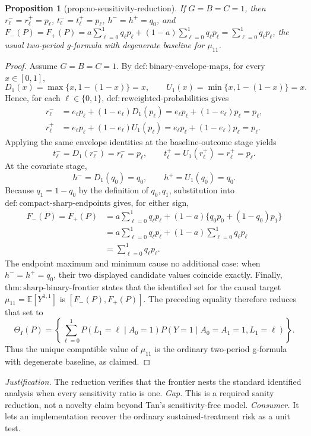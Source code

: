 \documentclass{article}
\newtheorem{proposition}{Proposition}
\begin{document}
\begin{proposition}[prop:no-sensitivity-reduction]\label{prop:no-sensitivity-reduction}
If \(G=B=C=1\), then \(r_\ell^-=r_\ell^+=p_\ell\), \(t_\ell^-=t_\ell^+=p_\ell\), \(h^-=h^+=q_0\), and \(F_-(P)=F_+(P)=a\sum_{\ell=0}^1q_\ell p_\ell+(1-a)\sum_{\ell=0}^1q_\ell p_\ell=\sum_{\ell=0}^1q_\ell p_\ell\), the usual two-period g-formula with degenerate baseline for \(\mu_{11}\).
\end{proposition}
\begin{proof}
Assume \(G=B=C=1\).  By \(\mathrm{def{:}binary\text{-}envelope\text{-}maps}\), for every \(x\in[0,1]\),
\[
D_1(x)=\max\{x,1-(1-x)\}=x,
\qquad
U_1(x)=\min\{x,1-(1-x)\}=x.
\]
Hence, for each \(\ell\in\{0,1\}\), \(\mathrm{def{:}reweighted\text{-}probabilities}\) gives
\[
\begin{aligned}
r_\ell^-
 &=e_\ell p_\ell+(1-e_\ell)D_1(p_\ell)
  =e_\ell p_\ell+(1-e_\ell)p_\ell=p_\ell,\\
r_\ell^+
 &=e_\ell p_\ell+(1-e_\ell)U_1(p_\ell)
  =e_\ell p_\ell+(1-e_\ell)p_\ell=p_\ell.
\end{aligned}
\]
Applying the same envelope identities at the baseline-outcome stage yields
\[
t_\ell^-=D_1(r_\ell^-)=r_\ell^-=p_\ell,
\qquad
t_\ell^+=U_1(r_\ell^+)=r_\ell^+=p_\ell.
\]
At the covariate stage,
\[
h^-=D_1(q_0)=q_0,
\qquad
h^+=U_1(q_0)=q_0.
\]
Because \(q_1=1-q_0\) by the definition of \(q_0,q_1\), substitution into \(\mathrm{def{:}compact\text{-}sharp\text{-}endpoints}\) gives, for either sign,
\[
\begin{aligned}
F_-(P)=F_+(P)
 &=a\sum_{\ell=0}^1q_\ell p_\ell
   +(1-a)\{q_0p_0+(1-q_0)p_1\}\\
 &=a\sum_{\ell=0}^1q_\ell p_\ell
   +(1-a)\sum_{\ell=0}^1q_\ell p_\ell\\
 &=\sum_{\ell=0}^1q_\ell p_\ell.
\end{aligned}
\]
The endpoint maximum and minimum cause no additional case: when \(h^-=h^+=q_0\), their two displayed candidate values coincide exactly.  Finally, \(\mathrm{thm{:}sharp\text{-}binary\text{-}frontier}\) states that the identified set for the causal target \(\mu_{11}=\mathbb E[Y^{1,1}]\) is \([F_-(P),F_+(P)]\).  The preceding equality therefore reduces that set to
\[
\Theta_I(P)=\left\{\sum_{\ell=0}^1
P(L_1=\ell\mid A_0=1)
P(Y=1\mid A_0=A_1=1,L_1=\ell)\right\}.
\]
Thus the unique compatible value of \(\mu_{11}\) is the ordinary two-period g-formula with degenerate baseline, as claimed.
\end{proof}
\par\smallskip\noindent \textit{Justification.} The reduction verifies that the frontier nests the standard identified analysis when every sensitivity ratio is one. \textit{Gap.} This is a required sanity reduction, not a novelty claim beyond Tan's sensitivity-free model. \textit{Consumer.} It lets an implementation recover the ordinary sustained-treatment risk as a unit test.
\end{document}
